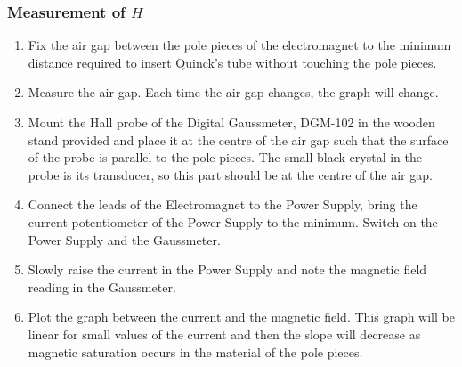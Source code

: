\documentclass[%
 sor,
 jor,
 amsmath,amssymb,
 reprint,
]{revtex4-2}
\begin{document}
\subsubsection{Measurement of $H$}

\begin{enumerate}
    \item Fix the air gap between the pole pieces of the electromagnet to the minimum distance required to insert Quinck's tube without touching the pole pieces.
    \item Measure the air gap. Each time the air gap changes, the graph will change.
    \item Mount the Hall probe of the Digital Gaussmeter, DGM-102 in the wooden stand provided and place it at the centre of the air gap such that the surface of the probe is parallel to the pole pieces. The small black crystal in the probe is its transducer, so this part should be at the centre of the air gap.
    \item Connect the leads of the Electromagnet to the Power Supply, bring the current potentiometer of the Power Supply to the minimum. Switch on the Power Supply and the Gaussmeter.
    \item Slowly raise the current in the Power Supply and note the magnetic field reading in the Gaussmeter.
    \item Plot the graph between the current and the magnetic field. This graph will be linear for small values of the current and then the slope will decrease as magnetic saturation occurs in the material of the pole pieces.
\end{enumerate}
\end{document}
